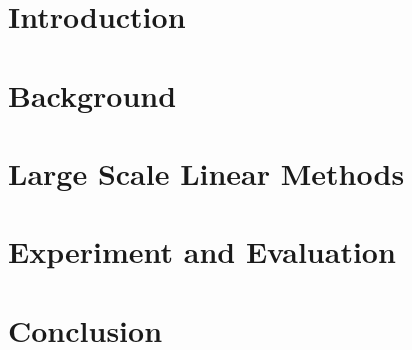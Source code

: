 \documentclass{article}
\begin{document}


\section{Introduction}


\section{Background}


% 

% 
\section{Large Scale Linear Methods}


\section{Experiment and Evaluation}


\section{Conclusion}




\end{document}
